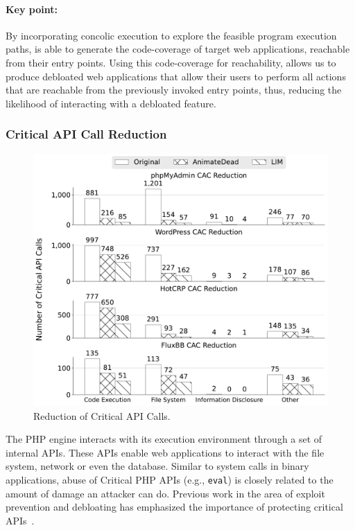 {\paragraph{Key point:} 
By incorporating concolic execution to explore the feasible program execution paths, \animatedead{} is able to generate the code-coverage of target web applications, reachable from their entry points. 
Using this code-coverage for reachability, allows us to produce debloated web applications that allow their users to perform all actions that are reachable from the previously invoked entry points, thus, reducing the likelihood of interacting with a debloated feature. 

\subsubsection*{Critical API Call Reduction}

\begin{figure}[t]
    \centering
    \includegraphics[width=0.9\columnwidth]{figures/ad/cac_reduction_bw.pdf}
    \caption{Reduction of Critical API Calls.}
    \label{fig:cac_reduction}
\end{figure}

The PHP engine interacts with its execution environment through a set of internal APIs. 
These APIs enable web applications to interact with the file system, network or even the database. 
Similar to system calls in binary applications, abuse of Critical PHP APIs (e.g., \texttt{eval}) is closely related to the amount of damage an attacker can do. 
Previous work in the area of exploit prevention and debloating has emphasized the importance of protecting critical APIs~\cite{Mishra2018, pappas2012kbouncer, fratric2012ropguard, bulekov2021saphire}. 

}
